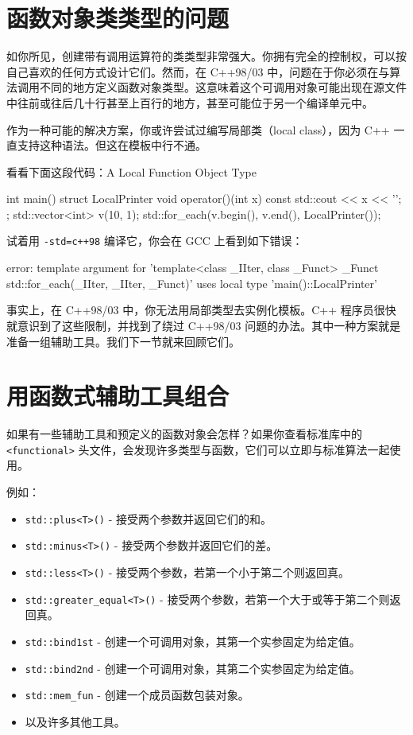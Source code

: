 \section{函数对象类类型的问题}

如你所见，创建带有调用运算符的类类型非常强大。你拥有完全的控制权，可以按自己喜欢的任何方式设计它们。然而，在 C++98/03 中，问题在于你必须在与算法调用不同的地方定义函数对象类型。这意味着这个可调用对象可能出现在源文件中往前或往后几十行甚至上百行的地方，甚至可能位于另一个编译单元中。

作为一种可能的解决方案，你或许尝试过编写局部类（local class），因为 C++ 一直支持这种语法。但这在模板中行不通。

看看下面这段代码：A Local Function Object Type

\begin{codebox}
int main() {
struct LocalPrinter {
void operator()(int x) const {
std::cout << x << '\n';
}
};
std::vector<int> v(10, 1);
std::for_each(v.begin(), v.end(), LocalPrinter());
}
\end{codebox}

试着用 \texttt{-std=c++98} 编译它，你会在 GCC 上看到如下错误：

\begin{codebox}
error: template argument for
'template<class _IIter, class _Funct> _Funct
std::for_each(_IIter, _IIter, _Funct)'
uses local type 'main()::LocalPrinter'
\end{codebox}

事实上，在 C++98/03 中，你无法用局部类型去实例化模板。C++ 程序员很快就意识到了这些限制，并找到了绕过 C++98/03 问题的办法。其中一种方案就是准备一组辅助工具。我们下一节就来回顾它们。

\section{用函数式辅助工具组合}

如果有一些辅助工具和预定义的函数对象会怎样？如果你查看标准库中的 \texttt{<functional>} 头文件，会发现许多类型与函数，它们可以立即与标准算法一起使用。

例如：

\begin{itemize}
\item \texttt{std::plus<T>()} - 接受两个参数并返回它们的和。
\item \texttt{std::minus<T>()} - 接受两个参数并返回它们的差。
\item \texttt{std::less<T>()} - 接受两个参数，若第一个小于第二个则返回真。
\item \texttt{std::greater\_equal<T>()} - 接受两个参数，若第一个大于或等于第二个则返回真。
\item \texttt{std::bind1st} - 创建一个可调用对象，其第一个实参固定为给定值。
\item \texttt{std::bind2nd} - 创建一个可调用对象，其第二个实参固定为给定值。
\item \texttt{std::mem\_fun} - 创建一个成员函数包装对象。
\item 以及许多其他工具。
\end{itemize}

